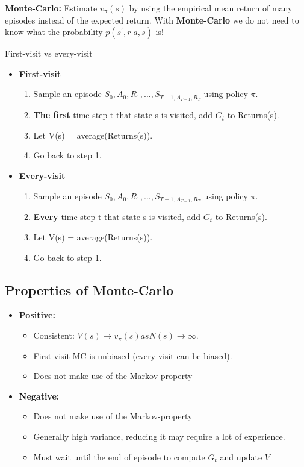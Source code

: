 \textbf{Monte-Carlo: } Estimate $v_\pi(s)$ by using the empirical mean return of many episodes instead of the expected return. With \textbf{Monte-Carlo} we do not need to know what the probability $p(s^{\prime},r|a,s)$ is!

\begin{wbox}{First-visit vs every-visit}
\begin{itemize}
	\item \textbf{First-visit}
		\begin{enumerate}
			\item Sample an episode $S_0,A_0,R_1,\ldots,S_{T-1, A_{T-1},R_T}$ using policy $\pi$.
			\item \textbf{The first} time step t that state s is visited, add $G_t$ to Returns(s).
			\item Let V(s) = average(Returns(s)).
			\item Go back to step 1.
		\end{enumerate}
	\item \textbf{Every-visit}
		\begin{enumerate}
			\item Sample an episode $S_0,A_0,R_1,\ldots,S_{T-1, A_{T-1},R_T}$ using policy $\pi$.
			\item \textbf{Every} time-step t that state s is visited, add $G_t$ to Returns(s).
			\item Let V(s) = average(Returns(s)).
			\item Go back to step 1.
		\end{enumerate}
\end{itemize}
\end{wbox}


\subsection*{Properties of Monte-Carlo}
\begin{itemize}
	\item \textbf{Positive: }
		\begin{itemize}
			\item Consistent: $V(s) \rightarrow v_\pi(s) as N(s) \rightarrow \infty$.
			\item First-visit MC is unbiased (every-visit can be biased).
			\item Does not make use of the Markov-property
		\end{itemize}
	\item \textbf{Negative: }
	\begin{itemize}
		\item Does not make use of the Markov-property
		\item Generally high variance, reducing it may require a lot of experience.
		\item Must wait until the end of episode to compute $G_t$ and update $V$
	\end{itemize}
\end{itemize}

